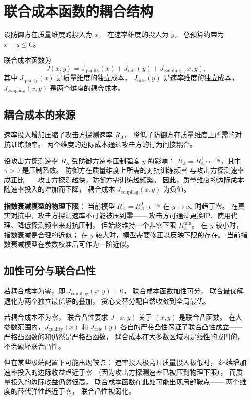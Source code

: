 \documentclass[11pt,a4paper]{article}
\begin{document}
\section{联合成本函数的耦合结构}

设防御方在质量维度的投入为 \(x\)，
在速率维度的投入为 \(y\)，
总预算约束为 \(x + y \le C\)。

联合成本函数为
\[
J(x, y) = J_{\text{quality}}(x) + J_{\text{rate}}(y) + J_{\text{coupling}}(x, y),
\]
其中 \(J_{\text{quality}}(x)\) 是质量维度的独立成本，
\(J_{\text{rate}}(y)\) 是速率维度的独立成本，
\(J_{\text{coupling}}(x, y)\) 是两个维度的耦合成本。

\subsection{耦合成本的来源}

速率投入增加压缩了攻击方探测速率 \(R_A\)，
降低了防御方在质量维度上所需的对抗训练频率。
两个维度的边际成本通过攻击方的行为间接耦合。

设攻击方探测速率 \(R_A\) 受防御方速率压制强度 \(y\) 的影响：
\(R_A = R_A^0 \cdot e^{-\gamma y}\)，其中 \(\gamma > 0\) 是压制系数。
防御方在质量维度上所需的对抗训练频率
与攻击方探测速率成正比——攻击方探测越快，防御方需训练越频繁。
因此，质量维度的边际成本随速率投入的增加而下降，
耦合成本 \(J_{\text{coupling}}(x, y)\) 为负值。

\textbf{指数衰减模型的物理下限}：
当前模型 \(R_A = R_A^0 \cdot e^{-\gamma y}\) 在 \(y \to \infty\) 时趋于零。
在真实对抗中，攻击方探测速率不可能被压到零——
攻击方可通过更换IP、使用代理、降低探测频率来对抗压制，
但始终维持一个非零下限 \(R_A^{\min}\)。
在 \(y\) 较小时，指数衰减是合理的近似；
在 \(y\) 较大时，模型需要修正以反映下限的存在。
当前指数衰减模型在参数校准后可作为一阶近似。

\subsection{加性可分与联合凸性}

若耦合成本为零，即 \(J_{\text{coupling}}(x, y) = 0\)，
联合成本函数加性可分，
联合最优解退化为两个独立最优解的叠加，
贪心交替分配自然收敛到全局最优。

若耦合成本不为零，
联合凸性要求 \(J(x, y)\) 关于 \((x, y)\) 是联合凸函数。
在大参数范围内，\(J_{\text{quality}}(x)\) 和 \(J_{\text{rate}}(y)\)
各自的严格凸性保证了联合凸性成立——
严格凸函数的和仍然是严格凸函数，
耦合成本在大多数区域内是线性的或凹的，
不会破坏联合凸性。

但在某些极端配置下可能出现鞍点：
速率投入极高且质量投入极低时，
继续增加速率投入的边际收益趋近于零
（因为攻击方探测速率已被压到物理下限），
而质量投入的边际收益仍然很高，
联合成本函数在此处可能出现局部鞍点——
两个维度的替代弹性趋近于零，
联合凸性被弱化。
\end{document}
